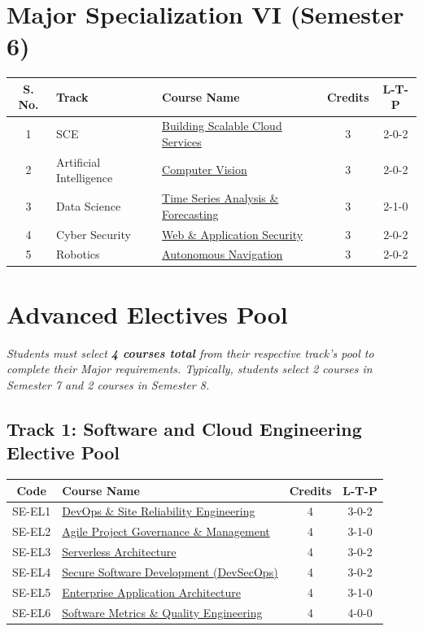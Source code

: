 \label{table:major6}
\section*{Major Specialization VI (Semester 6)}
\begin{longtable}{|c|l|p{7cm}|c|c|}
\hline
\textbf{S. No.} & \textbf{Track} & \textbf{Course Name} & \textbf{Credits} & \textbf{L-T-P} \\
\hline
1 & SCE & \hyperref[major:SE_6]{Building Scalable Cloud Services} & 3 & 2-0-2 \\
\hline
2 & Artificial Intelligence & \hyperref[major:ML_6]{Computer Vision} & 3 & 2-0-2 \\
\hline
3 & Data Science & \hyperref[major:DS_6]{Time Series Analysis \& Forecasting} & 3 & 2-1-0 \\
\hline
4 & Cyber Security & \hyperref[major:CS_6]{Web \& Application Security} & 3 & 2-0-2 \\
\hline
5 & Robotics & \hyperref[major:RB_6]{Autonomous Navigation} & 3 & 2-0-2 \\
\hline
\end{longtable}

\newpage
{}\label{table:electives}
\section*{Advanced Electives Pool}
\textit{Students must select \textbf{4 courses total} from their respective track's pool to complete their Major requirements. Typically, students select 2 courses in Semester 7 and 2 courses in Semester 8.}

\subsection*{Track 1: Software and Cloud Engineering Elective Pool}
\begin{longtable}{|c|p{8cm}|c|c|}
\hline
\textbf{Code} & \textbf{Course Name} & \textbf{Credits} & \textbf{L-T-P} \\
\hline
SE-EL1 & \hyperref[elec:SE_1]{DevOps \& Site Reliability Engineering} & 4 & 3-0-2 \\
\hline
SE-EL2 & \hyperref[elec:SE_2]{Agile Project Governance \& Management} & 4 & 3-1-0 \\
\hline
SE-EL3 & \hyperref[elec:SE_3]{Serverless Architecture} & 4 & 3-0-2 \\
\hline
SE-EL4 & \hyperref[elec:SE_4]{Secure Software Development (DevSecOps)} & 4 & 3-0-2 \\
\hline
SE-EL5 & \hyperref[elec:SE_5]{Enterprise Application Architecture} & 4 & 3-1-0 \\
\hline
SE-EL6 & \hyperref[elec:SE_6]{Software Metrics \& Quality Engineering} & 4 & 4-0-0 \\
\hline
\end{longtable}

